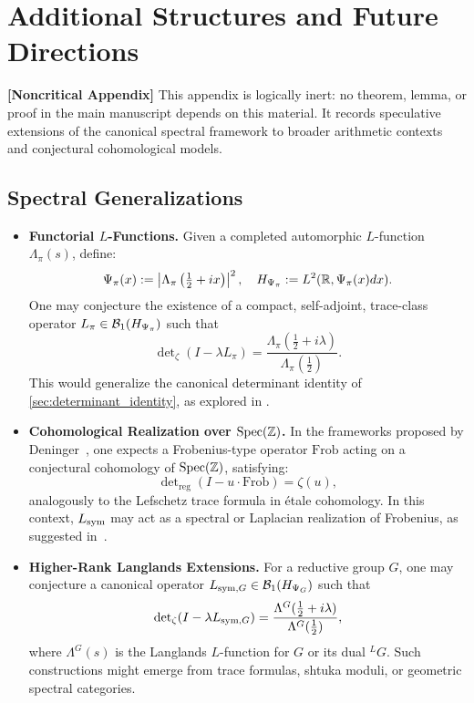 \section{Additional Structures and Future Directions}
\label{app:additional_structures}

\noindent\textbf{[Noncritical Appendix]}  
This appendix is logically inert: no theorem, lemma, or proof in the main manuscript depends on this material. It records speculative extensions of the canonical spectral framework to broader arithmetic contexts and conjectural cohomological models.

\subsection*{Spectral Generalizations}

\begin{itemize}
  \item \textbf{Functorial \( L \)-Functions.}  
  Given a completed automorphic \( L \)-function \( \Lambda_\pi(s) \), define:
  \[
  \Psi_\pi(x) := \left| \Lambda_\pi\left( \tfrac{1}{2} + i x \right) \right|^2, \quad
  H_{\Psi_\pi} := L^2(\mathbb{R}, \Psi_\pi(x) dx).
  \]
  One may conjecture the existence of a compact, self-adjoint, trace-class operator \( L_\pi \in \mathcal{B}_1(H_{\Psi_\pi}) \) such that
  \[
  \det\nolimits_\zeta(I - \lambda L_\pi) = \frac{\Lambda_\pi(\tfrac{1}{2} + i\lambda)}{\Lambda_\pi(\tfrac{1}{2})}.
  \]
  This would generalize the canonical determinant identity of \cref{sec:determinant_identity}, as explored in .

  \item \textbf{Cohomological Realization over \( \mathrm{Spec}(\mathbb{Z}) \).}  
  In the frameworks proposed by Deninger~\cite{Deninger1998Frobenius}, one expects a Frobenius-type operator \( \mathrm{Frob} \) acting on a conjectural cohomology of \( \mathrm{Spec}(\mathbb{Z}) \), satisfying:
  \[
  \det\nolimits_{\mathrm{reg}}(I - u \cdot \mathrm{Frob}) = \zeta(u),
  \]
  analogously to the Lefschetz trace formula in étale cohomology. In this context, \( L_{\mathrm{sym}} \) may act as a spectral or Laplacian realization of Frobenius, as suggested in~\cite{Connes1999TraceFormula}.

  \item \textbf{Higher-Rank Langlands Extensions.}  
  For a reductive group \( G \), one may conjecture a canonical operator \( L_{\mathrm{sym},G} \in \mathcal{B}_1(H_{\Psi_G}) \) such that
  \[
  \det\nolimits_\zeta(I - \lambda L_{\mathrm{sym},G}) = \frac{\Lambda^G(\tfrac{1}{2} + i\lambda)}{\Lambda^G(\tfrac{1}{2})},
  \]
  where \( \Lambda^G(s) \) is the Langlands \( L \)-function for \( G \) or its dual \( {}^LG \). Such constructions might emerge from trace formulas, shtuka moduli, or geometric spectral categories.
\end{itemize}

